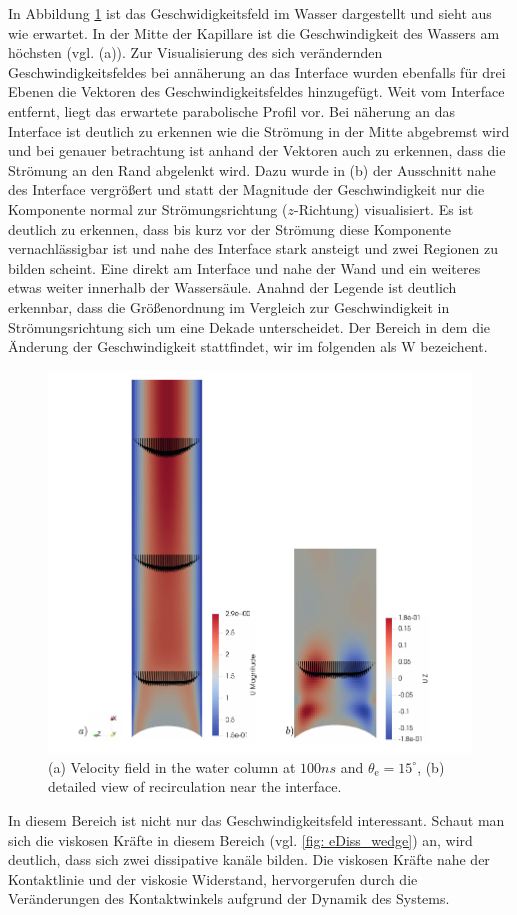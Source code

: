 In Abbildung \ref*{fig: Velofield_Wedge} ist das Geschwidigkeitsfeld im Wasser dargestellt und sieht aus wie erwartet. In der Mitte der Kapillare ist die Geschwindigkeit des Wassers am höchsten (vgl. (a)). Zur Visualisierung des sich verändernden Geschwindigkeitsfeldes bei annäherung an das Interface wurden ebenfalls für drei Ebenen die Vektoren des Geschwindigkeitsfeldes hinzugefügt. Weit vom Interface entfernt, liegt das erwartete parabolische Profil vor. Bei näherung an das Interface ist deutlich zu erkennen wie die Strömung in der Mitte abgebremst wird und bei genauer betrachtung ist anhand der Vektoren auch zu erkennen, dass die Strömung an den Rand abgelenkt wird. Dazu wurde in (b) der Ausschnitt nahe des Interface vergrößert und statt der Magnitude der Geschwindigkeit nur die Komponente normal zur Strömungsrichtung ($z$-Richtung) visualisiert. Es ist deutlich zu erkennen, dass bis kurz vor der Strömung diese Komponente vernachlässigbar ist und nahe des Interface stark ansteigt und zwei Regionen zu bilden scheint. Eine direkt am Interface und nahe der Wand und ein weiteres etwas weiter innerhalb der Wassersäule. Anahnd der Legende ist deutlich erkennbar, dass die Größenordnung im Vergleich zur Geschwindigkeit in Strömungsrichtung sich um eine Dekade unterscheidet. Der Bereich in dem die Änderung der Geschwindigkeit stattfindet, wir im folgenden als $\mathrm{W}$ bezeichent.

\begin{figure}[h]
    \centering
    \includegraphics[width=.95\textwidth]{Pictures/Velo_Wedge.pdf}
    \caption{(a) Velocity field in the water column at $100ns$ and $\theta_{\mathrm{e}}=15^{\circ}$, (b) detailed view of recirculation near the interface.}
    \label{fig: Velofield_Wedge}
\end{figure}
In diesem Bereich ist nicht nur das Geschwindigkeitsfeld interessant. Schaut man sich die viskosen Kräfte in diesem Bereich (vgl. \ref*{fig: eDiss_wedge}) an, wird deutlich, dass sich zwei dissipative kanäle bilden. Die viskosen Kräfte nahe der Kontaktlinie und der viskosie Widerstand, hervorgerufen durch die Veränderungen des Kontaktwinkels aufgrund der Dynamik des Systems.

